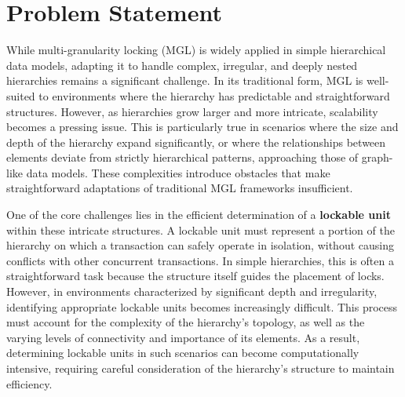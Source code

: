 

\section{Problem Statement}

While multi-granularity locking (MGL) is widely applied in simple hierarchical data models, adapting it to handle complex, irregular, and deeply nested hierarchies remains a significant challenge. In its traditional form, MGL is well-suited to environments where the hierarchy has predictable and straightforward structures. However, as hierarchies grow larger and more intricate, scalability becomes a pressing issue. This is particularly true in scenarios where the size and depth of the hierarchy expand significantly, or where the relationships between elements deviate from strictly hierarchical patterns, approaching those of graph-like data models. These complexities introduce obstacles that make straightforward adaptations of traditional MGL frameworks insufficient.

One of the core challenges lies in the efficient determination of a \textbf{lockable unit} within these intricate structures. A lockable unit must represent a portion of the hierarchy on which a transaction can safely operate in isolation, without causing conflicts with other concurrent transactions. In simple hierarchies, this is often a straightforward task because the structure itself guides the placement of locks. However, in environments characterized by significant depth and irregularity, identifying appropriate lockable units becomes increasingly difficult. This process must account for the complexity of the hierarchy’s topology, as well as the varying levels of connectivity and importance of its elements. As a result, determining lockable units in such scenarios can become computationally intensive, requiring careful consideration of the hierarchy’s structure to maintain efficiency.

